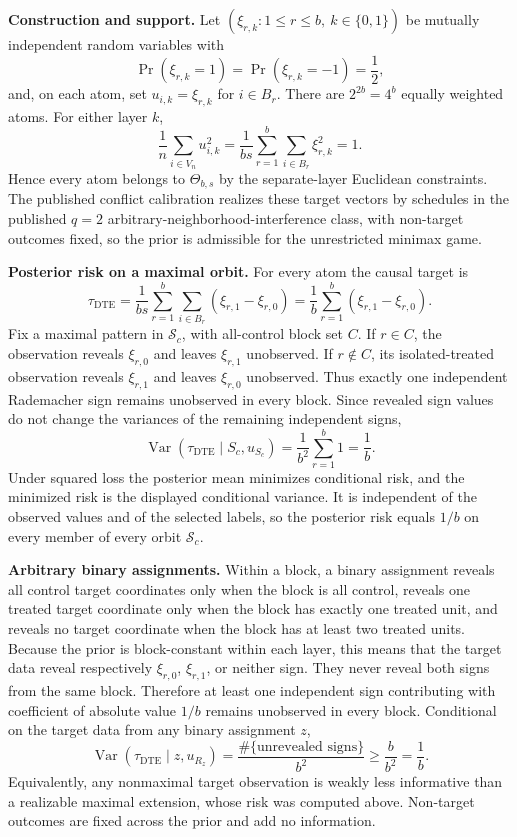 \textbf{Construction and support.}
Let \((\xi_{r,k}:1\leq r\leq b,\ k\in\{0,1\})\) be mutually independent random variables with
\[
\Pr(\xi_{r,k}=1)=\Pr(\xi_{r,k}=-1)=\frac12,
\]
and, on each atom, set \(u_{i,k}=\xi_{r,k}\) for \(i\in B_r\).  There are \(2^{2b}=4^b\) equally weighted atoms.  For either layer \(k\),
\[
\frac1n\sum_{i\in V_n}u_{i,k}^2
=\frac1{bs}\sum_{r=1}^b\sum_{i\in B_r}\xi_{r,k}^2
=1.
\]
Hence every atom belongs to \(\Theta_{b,s}\) by the separate-layer Euclidean constraints.  The published conflict calibration realizes these target vectors by schedules in the published \(q=2\) arbitrary-neighborhood-interference class, with non-target outcomes fixed, so the prior is admissible for the unrestricted minimax game.

\textbf{Posterior risk on a maximal orbit.}
For every atom the causal target is
\[
\tau_{\mathrm{DTE}}
=\frac1{bs}\sum_{r=1}^b\sum_{i\in B_r}(\xi_{r,1}-\xi_{r,0})
=\frac1b\sum_{r=1}^b(\xi_{r,1}-\xi_{r,0}).
\]
Fix a maximal pattern in \(\mathcal S_c\), with all-control block set \(C\).  If \(r\in C\), the observation reveals \(\xi_{r,0}\) and leaves \(\xi_{r,1}\) unobserved.  If \(r\notin C\), its isolated-treated observation reveals \(\xi_{r,1}\) and leaves \(\xi_{r,0}\) unobserved.  Thus exactly one independent Rademacher sign remains unobserved in every block.  Since revealed sign values do not change the variances of the remaining independent signs,
\[
\operatorname{Var}\!\left(\tau_{\mathrm{DTE}}\mid S_c,u_{S_c}\right)
=\frac1{b^2}\sum_{r=1}^b1
=\frac1b.
\]
Under squared loss the posterior mean minimizes conditional risk, and the minimized risk is the displayed conditional variance.  It is independent of the observed values and of the selected labels, so the posterior risk equals \(1/b\) on every member of every orbit \(\mathcal S_c\).

\textbf{Arbitrary binary assignments.}
Within a block, a binary assignment reveals all control target coordinates only when the block is all control, reveals one treated target coordinate only when the block has exactly one treated unit, and reveals no target coordinate when the block has at least two treated units.  Because the prior is block-constant within each layer, this means that the target data reveal respectively \(\xi_{r,0}\), \(\xi_{r,1}\), or neither sign.  They never reveal both signs from the same block.  Therefore at least one independent sign contributing with coefficient of absolute value \(1/b\) remains unobserved in every block.  Conditional on the target data from any binary assignment \(z\),
\[
\operatorname{Var}\!\left(\tau_{\mathrm{DTE}}\mid z,u_{R_z}\right)
=\frac{\#\{\text{unrevealed signs}\}}{b^2}
\geq\frac b{b^2}
=\frac1b.
\]
Equivalently, any nonmaximal target observation is weakly less informative than a realizable maximal extension, whose risk was computed above.  Non-target outcomes are fixed across the prior and add no information.

